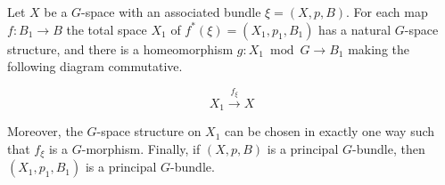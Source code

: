 Let $X$ be a $G$-space with an associated bundle $\xi = (X, p, B)$. For each map $f: B_1 \rightarrow B$ the total space $X_1$ of $f^*(\xi) = (X_1, p_1, B_1)$ has a natural $G$-space structure, and there is a homeomorphism $g: X_1 \bmod G \rightarrow B_1$ making the following diagram commutative.

$$X_1 \xrightarrow{f_\xi} X$$

Moreover, the $G$-space structure on $X_1$ can be chosen in exactly one way such that $f_\xi$ is a $G$-morphism. Finally, if $(X, p, B)$ is a principal $G$-bundle, then $(X_1, p_1, B_1)$ is a principal $G$-bundle.

